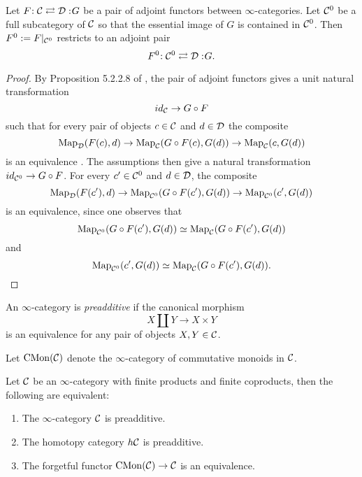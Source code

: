 




\begin{proposition}
\label{Restrict adjoints to full subcategory}
	Let $F\negmedspace: {\mathcal{C}}\rightleftarrows {\mathcal{D}}:\negmedspace G$ be a pair of adjoint functors between $\infty$-categories.
	Let ${\mathcal{C}}^0$ be a full subcategory of ${\mathcal{C}}$ so that the essential image of $G$ is contained in ${\mathcal{C}}^0$. Then $F^0:=F|_{{\mathcal{C}}^0}$ restricts to an adjoint pair 
	$$
	F^0\negmedspace: {\mathcal{C}}^0\rightleftarrows {\mathcal{D}}:\negmedspace G.
	$$
\end{proposition}
\begin{proof}
    By Proposition 5.2.2.8 of \cite{HTT}, the pair of adjoint functors gives a unit natural transformation
    \[
    id_{{\mathcal{C}}} \to G\circ F
    \]
    such that for every pair of objects $c\in {\mathcal{C}}$ and $d\in {\mathcal{D}}$ the composite
    \[
    \operatorname{Map}_{{\mathcal{D}}}(F(c),d) \to \operatorname{Map}_{\mathcal{C}}(G\circ F(c),G(d)) \to \operatorname{Map}_{{\mathcal{C}}}(c,G(d))
    \]
    is an equivalence .
	The assumptions then give a natural transformation $id_{{\mathcal{C}}^{0}}\to G\circ F$.
	For every $c'\in {\mathcal{C}}^0$ and $d\in {\mathcal{D}}$, the composite 
	\[
	\operatorname{Map}_{{\mathcal{D}}}(F(c'),d) \to \operatorname{Map}_{{\mathcal{C}}^0}(G\circ F(c'),G(d)) \to \operatorname{Map}_{{\mathcal{C}}^{0}}(c',G(d))
	\] 
	is an equivalence, since one observes that
	$$
	\operatorname{Map}_{{\mathcal{C}}^0}(G\circ F(c'),G(d))\simeq \operatorname{Map}_{{\mathcal{C}}}(G\circ F(c'),G(d))
	$$
	and 
	$$
	\operatorname{Map}_{{\mathcal{C}}^0}(c',G(d))\simeq \operatorname{Map}_{{\mathcal{C}}}(G\circ F(c'),G(d)).
	$$
	\end{proof}

\begin{definition}
\cite[Definition 2.1]{Gepner-Moritz-Nikolaus}
\label{preadditive}
    An $\infty$-category is \emph{preadditive} if the canonical morphism 
    $$
    X\coprod Y \to X\times Y
    $$
    is an equivalence for any pair of objects $X,Y \in {\mathcal{C}}$.
\end{definition}

Let $\operatorname{CMon}({\mathcal{C}})$ denote the $\infty$-category of commutative monoids in ${\mathcal{C}}$.
\begin{proposition}
\label{Prop 2.3 GMN}
\cite[Proposition 2.3]{Gepner-Moritz-Nikolaus}
Let ${\mathcal{C}}$ be an $\infty$-category with finite products and finite coproducts, 
    then the following are equivalent:
    \begin{enumerate}
        \item The $\infty$-category ${\mathcal{C}}$ is preadditive.
        \item The homotopy category $h{\mathcal{C}}$ is preadditive.
        \item The forgetful functor $\operatorname{CMon}({\mathcal{C}}) \to {\mathcal{C}}$ is an equivalence.
    \end{enumerate}
\end{proposition}

